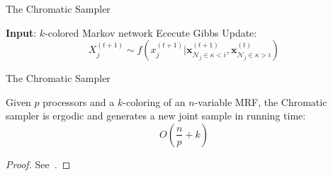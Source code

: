 \documentclass[onlymath,xcolor=pdftex,dvipsnames,table]{beamer}
\theoremstyle{remark} %
\begin{document}
{
\begin{frame}[fragile]{The Chromatic Sampler}
\begin{algorithm}[H]
  \caption{The Chromatic Sampler}
  \begin{algorithmic}
    \State\textbf{Input}: $k$-colored Markov network
        \State Ececute Gibbs Update: $$X_j^{(t+1)}\sim f\left(x_j^{(t+1)}|\mathbf{x}_{\mathcal{N}_j\in\kappa<i}^{(t+1)},\mathbf{x}_{\mathcal{N}_j\in\kappa>i}^{(t)}\right)$$
      \EndParFor
    \EndFor
  \end{algorithmic}
\end{algorithm}
\end{frame}
}

\begin{frame}{The Chromatic Sampler}
\begin{theorem}
Given $p$ processors and a $k$-coloring of an $n$-variable MRF, the Chromatic sampler is ergodic and generates a new joint sample in running time:
$$O\left(\frac{n}{p}+k\right)$$
\end{theorem}
\begin{proof}
See~\cite{gonzalez2011parallel}.
\end{proof}
\end{frame}
\end{document}
